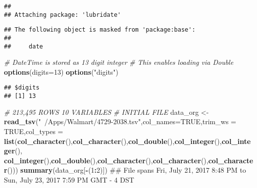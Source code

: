 \documentclass[]{article}
\newenvironment{Shaded}{\begin{snugshade}}{\end{snugshade}}
\newcommand{\KeywordTok}[1]{\textcolor[rgb]{0.13,0.29,0.53}{\textbf{#1}}}
\newcommand{\DataTypeTok}[1]{\textcolor[rgb]{0.13,0.29,0.53}{#1}}
\newcommand{\DecValTok}[1]{\textcolor[rgb]{0.00,0.00,0.81}{#1}}
\newcommand{\StringTok}[1]{\textcolor[rgb]{0.31,0.60,0.02}{#1}}
\newcommand{\CommentTok}[1]{\textcolor[rgb]{0.56,0.35,0.01}{\textit{#1}}}
\newcommand{\OtherTok}[1]{\textcolor[rgb]{0.56,0.35,0.01}{#1}}
\newcommand{\OperatorTok}[1]{\textcolor[rgb]{0.81,0.36,0.00}{\textbf{#1}}}
\newcommand{\NormalTok}[1]{#1}
\begin{document}
\begin{verbatim}
## 
## Attaching package: 'lubridate'
\end{verbatim}

\begin{verbatim}
## The following object is masked from 'package:base':
## 
##     date
\end{verbatim}

\begin{Shaded}
\begin{Highlighting}[]
\CommentTok{# DateTime is stored as 13 digit integer}
\CommentTok{# This enables loading via Double}
\KeywordTok{options}\NormalTok{(}\DataTypeTok{digits=}\DecValTok{13}\NormalTok{)}
\KeywordTok{options}\NormalTok{(}\StringTok{"digits"}\NormalTok{)}
\end{Highlighting}
\end{Shaded}

\begin{verbatim}
## $digits
## [1] 13
\end{verbatim}

\begin{Shaded}
\begin{Highlighting}[]
\CommentTok{# 213,495 ROWS 10 VARIABLES}
\CommentTok{# INITIAL FILE}
\NormalTok{data_org <-}\StringTok{ }\KeywordTok{read_tsv}\NormalTok{(}\StringTok{"~/Apps/Walmart/4729-2038.tsv"}\NormalTok{,}\DataTypeTok{col_names=}\OtherTok{TRUE}\NormalTok{,}\DataTypeTok{trim_ws =} \OtherTok{TRUE}\NormalTok{,}\DataTypeTok{col_types =} 
                   \KeywordTok{list}\NormalTok{(}\KeywordTok{col_character}\NormalTok{(),}\KeywordTok{col_character}\NormalTok{(),}\KeywordTok{col_double}\NormalTok{(),}\KeywordTok{col_integer}\NormalTok{(),}\KeywordTok{col_integer}\NormalTok{(),}
                   \KeywordTok{col_integer}\NormalTok{(),}\KeywordTok{col_double}\NormalTok{(),}\KeywordTok{col_character}\NormalTok{(),}\KeywordTok{col_character}\NormalTok{(),}\KeywordTok{col_character}\NormalTok{()))}
\KeywordTok{summary}\NormalTok{(data_org[}\OperatorTok{-}\NormalTok{(}\DecValTok{1}\OperatorTok{:}\DecValTok{2}\NormalTok{)])  ## File spans Fri, July 21, 2017 8:48 PM to Sun, July 23, 2017 7:59 PM GMT - 4 DST}
\end{Highlighting}
\end{Shaded}
\end{document}
